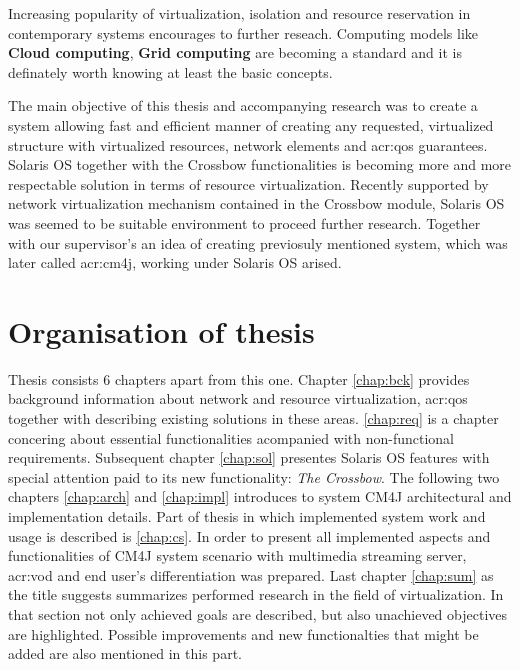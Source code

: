\documentclass[11pt]{book}
\begin{document}
	
	Increasing popularity of virtualization, isolation and resource reservation in contemporary systems encourages to 
	further reseach. Computing models like \textbf{Cloud computing}, \textbf{Grid computing} are becoming a standard and it 
	is definately worth knowing at least the basic concepts.

	\medskip
	
 	The main objective of this thesis and accompanying research was to create a system allowing fast and efficient 
	manner of creating any requested, virtualized structure with virtualized resources, network elements and \gls{acr:qos} guarantees.
	Solaris OS together with the Crossbow functionalities is becoming more and more respectable solution in terms of resource virtualization. 
	Recently supported by network virtualization mechanism contained in the Crossbow module, Solaris OS was seemed to be 
	suitable environment to proceed further research.  Together with our supervisor's an idea of creating previosuly mentioned system, 
	which was later called \gls{acr:cm4j}, working under Solaris OS arised. 

	\section{Organisation of thesis}

	Thesis consists 6 chapters apart from this one. Chapter \ref{chap:bck} provides background information about network and resource
	 virtualization,  \gls{acr:qos} together with describing existing solutions in these areas. \ref{chap:req} is a chapter concering
	 about essential functionalities acompanied with non-functional requirements. Subsequent chapter \ref{chap:sol} presentes
	 Solaris OS features with special attention paid to its new functionality: \textit{The Crossbow}. The following
	 two chapters \ref{chap:arch} and \ref{chap:impl} introduces to system CM4J architectural and implementation details. %
	Part of thesis in which implemented system work and usage is described is \ref{chap:cs}. In order to present all implemented aspects
	and functionalities of CM4J system scenario with multimedia streaming server, \gls{acr:vod} and end user's differentiation was prepared. 
	Last chapter \ref{chap:sum} as the title suggests summarizes performed research in the field of virtualization. In that section
	not only achieved goals are described, but also unachieved objectives are highlighted. Possible improvements and new 
	functionalties that might be added are also mentioned in this part. 
\end{document}
